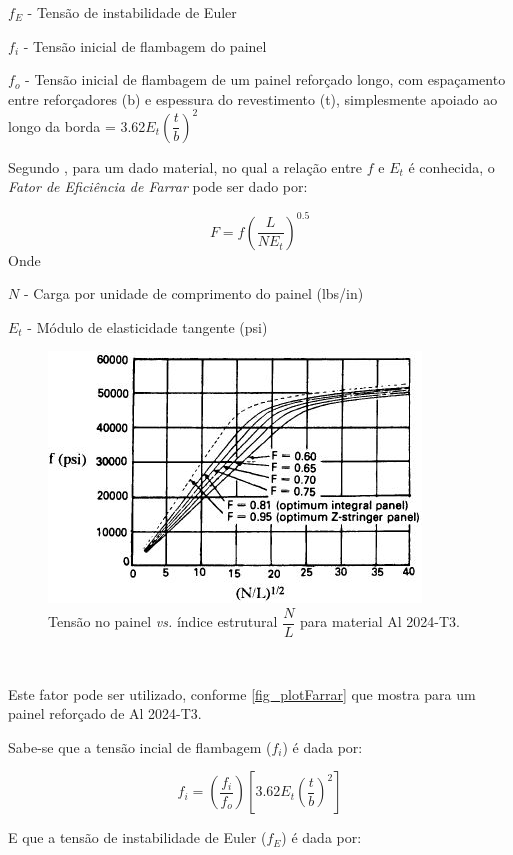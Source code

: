 $f_E$ - Tensão de instabilidade de Euler\

$f_i$ - Tensão inicial de flambagem do painel\

$f_o$ - Tensão inicial de flambagem de um painel reforçado longo, com espaçamento entre reforçadores (b) e espessura do revestimento (t), simplesmente apoiado ao longo da borda = 3.62$E_t$$(\dfrac{t}{b})^2$\

Segundo \cite{niu1997airframe}, para um dado material, no qual a relação entre $f$ e $E_t$ é conhecida, o \emph{Fator de Eficiência de Farrar} pode ser dado por:

\begin{equation} \label{Farrar}
F = f(\dfrac{L}{N E_t})^{0.5}
\end{equation}
Onde

$N$ - Carga por unidade de comprimento do painel (lbs/in)\

$E_t$ - Módulo de elasticidade tangente (psi)

\begin{figure}[h]
	\caption{\label{fig_plotFarrar}Tensão no painel \emph{vs.} índice estrutural $\dfrac{N}{L}$ para material Al 2024-T3.}
  \centering
  \includegraphics[scale=1.0]{figura/PlotFarrar}
\end{figure}
\

Este fator pode ser utilizado, conforme \autoref{fig_plotFarrar} que mostra para um painel reforçado de Al 2024-T3.

Sabe-se que a tensão incial de flambagem ($f_i$) é dada por:

\begin{equation} \label{InitialBuck}
f_i = (\dfrac{f_i}{f_o})[{3.62E_t(\dfrac{t}{b})^2}]
\end{equation}

E que a tensão de instabilidade de Euler ($f_E$) é dada por:

